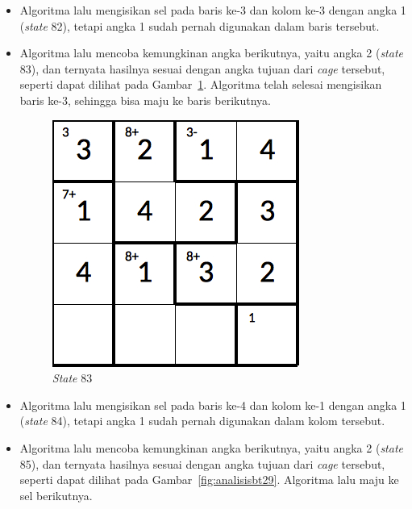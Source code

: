 \documentclass[a4paper,twoside]{article}
\begin{document}
\begin{enumerate}
\begin{itemize}
\item Algoritma lalu mengisikan sel pada baris ke-3 dan kolom ke-3 dengan angka 1 (\textit{state} 82), tetapi angka 1 sudah pernah digunakan dalam baris tersebut.
\item Algoritma lalu mencoba kemungkinan angka berikutnya, yaitu angka 2 (\textit{state} 83), dan ternyata hasilnya sesuai dengan angka tujuan dari \textit{cage} tersebut, seperti dapat dilihat pada Gambar~\ref{fig:analisisbt28}. Algoritma telah selesai mengisikan baris ke-3, sehingga bisa maju ke baris berikutnya.

\begin{figure}
\centering
\captionsetup{justification=centering}
\includegraphics[scale=0.333]{Gambar/backtracking/State83}
\caption[\textit{State} 83]{\textit{State} 83}
\label{fig:analisisbt28}
\end{figure}

\item Algoritma lalu mengisikan sel pada baris ke-4 dan kolom ke-1 dengan angka 1 (\textit{state} 84), tetapi angka 1 sudah pernah digunakan dalam kolom tersebut.
\item Algoritma lalu mencoba kemungkinan angka berikutnya, yaitu angka 2 (\textit{state} 85), dan ternyata hasilnya sesuai dengan angka tujuan dari \textit{cage} tersebut, seperti dapat dilihat pada Gambar~\ref{fig:analisisbt29}. Algoritma lalu maju ke sel berikutnya.


\end{itemize}
\end{enumerate}
\end{document}
